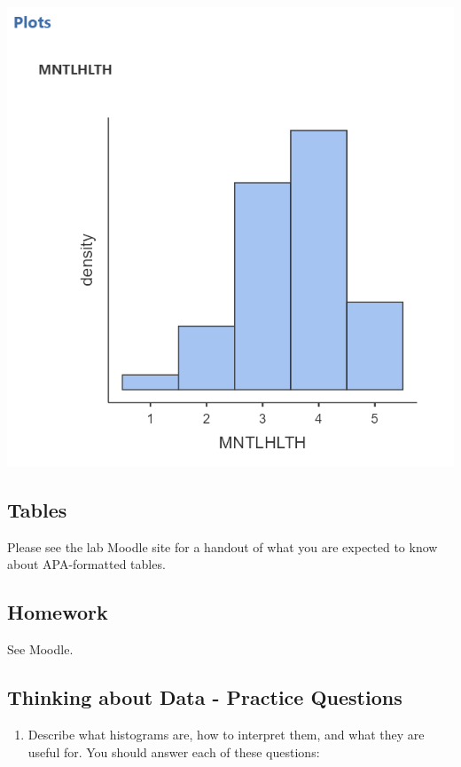 \documentclass[
]{book}
\providecommand{\tightlist}{%
  \setlength{\itemsep}{0pt}\setlength{\parskip}{0pt}}
\begin{document}
\includegraphics{img/MNTLHLTHHistogram.png}

\hypertarget{tables}{%
\subsection{Tables}\label{tables}}

Please see the lab Moodle site for a handout of what you are expected to know about APA-formatted tables.

\hypertarget{homework-2}{%
\subsection{Homework}\label{homework-2}}

See Moodle.

\hypertarget{thinking-about-data---practice-questions}{%
\subsection{Thinking about Data - Practice Questions}\label{thinking-about-data---practice-questions}}

\begin{enumerate}
\def\labelenumi{\arabic{enumi}.}
\tightlist
\item
  Describe what histograms are, how to interpret them, and what they are useful for. You should answer each of these questions:
\end{enumerate}
\end{document}
